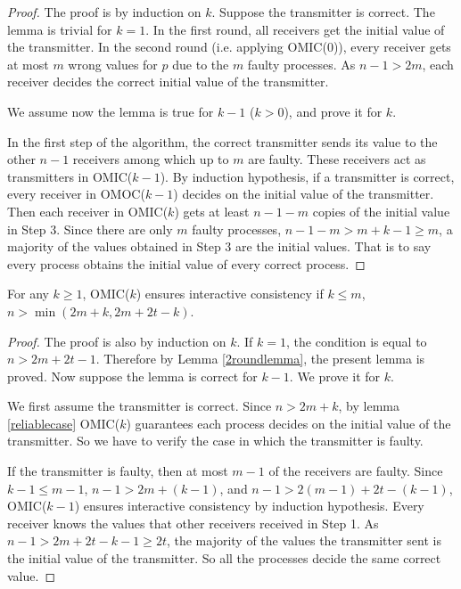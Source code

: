 \begin{proof}
  The proof is by induction on $k$. Suppose the transmitter is correct. The
  lemma is trivial for $k=1$.
In the first round, all receivers get the initial value of the transmitter. In the second
  round (i.e. applying OMIC($0$)), every receiver gets at most $m$ wrong
  values for $p$ due to the $m$ faulty processes.
 As $n-1>2m$, each
  receiver decides the correct initial value of the transmitter.

  We assume now the
  lemma is true for $k-1$ ($k>0$), and prove it for $k$.
  
 

  In the first step of the algorithm, the correct transmitter sends its value
  to the other $n-1$ receivers among which up to $m$ are faulty. 
  These receivers act as transmitters in OMIC($k-1$). 
  By induction hypothesis, if a transmitter is correct, every receiver in OMOC($k-1$)
  decides on the initial value of the transmitter.
  Then each receiver in OMIC($k$)  gets at least $n-1-m$ copies of the
  initial value in Step $3$. Since there are only $m$ faulty processes,
  $n-1-m>m+k-1 \geqslant m$, a majority of the values obtained  in Step $3$
  are the initial values. That is to say every process obtains the initial
  value of every correct process.
\end{proof}

\begin{lemma}
  \label{mainlemma}For any $k \geqslant 1$, OMIC($k$) ensures
  interactive consistency if $k \leqslant m$, $n>\min(2m+k,2m+2t-k)$.
\end{lemma}

\begin{proof}
  The proof is also by induction on $k$. If $k=1$, the condition is equal to $n>2m+2t-1$.
  Therefore by Lemma \ref{2roundlemma}, the present lemma is proved.
  Now suppose
  the lemma is correct for $k-1$. We prove it for $k$.
  
  We first assume the transmitter is correct. Since $n>2m+k$, by lemma
  \ref{reliablecase} OMIC($k$) guarantees each process decides on  the initial
  value of the transmitter. So we have to verify the case in which
  the transmitter is faulty.
  
  If the transmitter is faulty, then at most $m-1$ of the receivers are
  faulty. Since $k-1\leqslant m-1$, $n-1>2m+ ( k-1 )$, and $n-1>2 ( m-1 ) +2t- (
  k-1 )$, OMIC($k-1$) ensures interactive consistency by induction hypothesis.
  Every receiver  knows the values that other receivers received in Step 1. As
  $n-1>2m+2t-k-1 \geqslant 2t$, the majority of the values the transmitter
  sent is the initial value of the transmitter. So all the processes decide
  the same correct value.
\end{proof}



